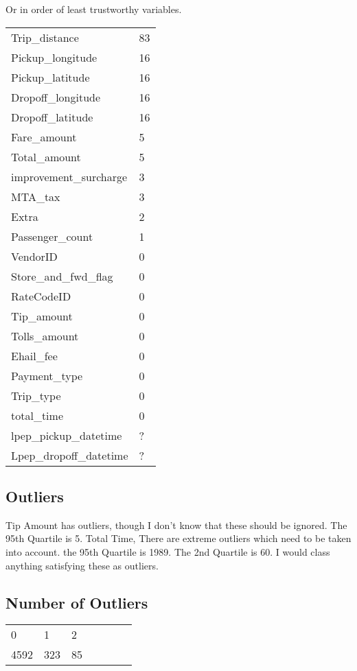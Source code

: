 \documentclass{article}
\begin{document}
Or in order of least trustworthy variables.
\begin{table}[H]
\centering
\begin{tabular}{ll}
Trip\_distance        &83\\
Pickup\_longitude    &  16\\
Pickup\_latitude     &  16\\
Dropoff\_longitude   &  16\\
Dropoff\_latitude     & 16\\
Fare\_amount & 5\\
Total\_amount         & 5\\
improvement\_surcharge & 3\\
MTA\_tax      &  3\\
Extra       & 2 \\
Passenger\_count       & 1\\
VendorID  &  0 \\
Store\_and\_fwd\_flag    & 0 \\
RateCodeID          & 0 \\
Tip\_amount    &   0\\
Tolls\_amount   &    0\\
Ehail\_fee       &     0\\
Payment\_type          & 0\\
Trip\_type            & 0\\
total\_time            & 0\\
lpep\_pickup\_datetime & ?\\
Lpep\_dropoff\_datetime& ?
\end{tabular}
\end{table}

\subsection{Outliers}
Tip Amount has outliers, though I don't know that these should be ignored. The 95th Quartile is 5.
Total Time, There are extreme outliers which need to be taken into account. the 95th Quartile is 1989. The 2nd Quartile is 60. I would class anything satisfying these as outliers.

\subsection{Number of Outliers}
\begin{table}[H]
\centering
\begin{tabular}{lllllll}
   0  &  1  &  2 \\
4592  & 323  & 85
\end{tabular}
\end{table}
\end{document}
